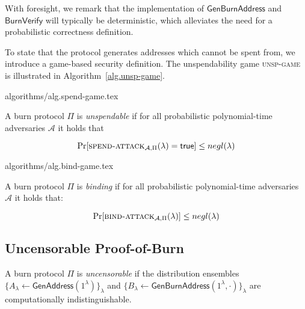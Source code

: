 With foresight, we remark that the implementation of $\mathsf{GenBurnAddress}$ and $\mathsf{BurnVerify}$ will typically be deterministic, which alleviates the need for a probabilistic correctness definition.

To state that the protocol generates addresses which cannot be spent from, we introduce a game-based security definition. The unspendability game \textsc{unsp-game} is illustrated in Algorithm~\ref{alg.unsp-game}.

{algorithms/alg.spend-game.tex}

\begin{definition}[Unspendability]
  A burn protocol $\Pi$ is \emph{unspendable} if
  for all probabilistic polynomial-time adversaries $\mathcal{A}$
  it holds that

  \[
    \Pr[\textsc{spend-attack}_{\mathcal{A},
    \Pi}(\lambda) = \textsf{true}] \leq negl(\lambda)
  \]
\end{definition}

{algorithms/alg.bind-game.tex}

\begin{definition}[Binding]
  A burn protocol $\Pi$ is \emph{binding} if
  for all probabilistic polynomial-time adversaries $\mathcal{A}$ it holds that:

  \[
    \Pr[\textsc{bind-attack}_{\mathcal{A},\Pi}(\lambda)] \leq negl(\lambda)
  \]
\end{definition}

\subsection{Uncensorable Proof-of-Burn}

\begin{definition}[Uncensorability]
  A burn protocol $\Pi$ is \emph{uncensorable} if
  the distribution ensembles $\{A_\lambda \gets \mathsf{GenAddress}(1^\lambda)\}_\lambda$ and
  $\{B_\lambda \gets \mathsf{GenBurnAddress}(1^\lambda, \cdot)\}_\lambda$ are computationally indistinguishable.
\end{definition}
